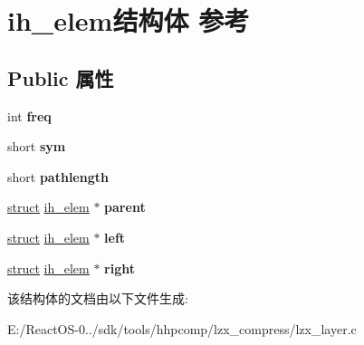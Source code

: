 \hypertarget{structih__elem}{}\section{ih\+\_\+elem结构体 参考}
\label{structih__elem}
\subsection*{Public 属性}
\begin{DoxyCompactItemize}
\item 
\mbox{\label{structih__elem_a6f4e07c74860c14dec1f2eff5602e9f5}} 
int {\bfseries freq}
\item 
\mbox{\label{structih__elem_ab22190c093fd3a936dc6fdd6ab2c2eb3}} 
short {\bfseries sym}
\item 
\mbox{\label{structih__elem_a53fbe2039164a0ae5341dbd5658705b6}} 
short {\bfseries pathlength}
\item 
\mbox{\label{structih__elem_a95d4cf6fbabf6f08baec74efd31a124c}} 
\hyperlink{interfacestruct}{struct} \hyperlink{structih__elem}{ih\+\_\+elem} $\ast$ {\bfseries parent}
\item 
\mbox{\label{structih__elem_a7a30f87d50143bab0e7741c7e7ae3c32}} 
\hyperlink{interfacestruct}{struct} \hyperlink{structih__elem}{ih\+\_\+elem} $\ast$ {\bfseries left}
\item 
\mbox{\label{structih__elem_a862096345e800712c8992503ae59c5d6}} 
\hyperlink{interfacestruct}{struct} \hyperlink{structih__elem}{ih\+\_\+elem} $\ast$ {\bfseries right}
\end{DoxyCompactItemize}


该结构体的文档由以下文件生成\+:\begin{DoxyCompactItemize}
\item 
E\+:/\+React\+O\+S-\/0../sdk/tools/hhpcomp/lzx\+\_\+compress/lzx\+\_\+layer.\+c\end{DoxyCompactItemize}
